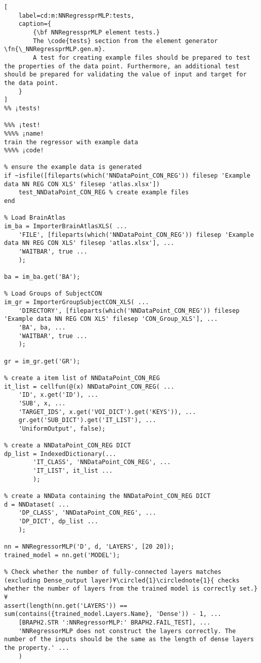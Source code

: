 \documentclass{tufte-handout}
\begin{document}
\begin{lstlisting}[
	label=cd:m:NNRegressprMLP:tests,
	caption={
		{\bf NNRegressprMLP element tests.}
		The \code{tests} section from the element generator \fn{\_NNRegressprMLP.gen.m}.
		A test for creating example files should be prepared to test the properties of the data point. Furthermore, an additional test should be prepared for validating the value of input and target for the data point.
	}
]			
%% ¡tests!

%%% ¡test!
%%%% ¡name!
train the regressor with example data
%%%% ¡code!

% ensure the example data is generated
if ~isfile([fileparts(which('NNDataPoint_CON_REG')) filesep 'Example data NN REG CON XLS' filesep 'atlas.xlsx'])
    test_NNDataPoint_CON_REG % create example files
end

% Load BrainAtlas
im_ba = ImporterBrainAtlasXLS( ...
    'FILE', [fileparts(which('NNDataPoint_CON_REG')) filesep 'Example data NN REG CON XLS' filesep 'atlas.xlsx'], ...
    'WAITBAR', true ...
    );

ba = im_ba.get('BA');

% Load Groups of SubjectCON
im_gr = ImporterGroupSubjectCON_XLS( ...
    'DIRECTORY', [fileparts(which('NNDataPoint_CON_REG')) filesep 'Example data NN REG CON XLS' filesep 'CON_Group_XLS'], ...
    'BA', ba, ...
    'WAITBAR', true ...
    );

gr = im_gr.get('GR');

% create a item list of NNDataPoint_CON_REG
it_list = cellfun(@(x) NNDataPoint_CON_REG( ...
    'ID', x.get('ID'), ...
    'SUB', x, ...
    'TARGET_IDS', x.get('VOI_DICT').get('KEYS')), ...
    gr.get('SUB_DICT').get('IT_LIST'), ...
    'UniformOutput', false);

% create a NNDataPoint_CON_REG DICT
dp_list = IndexedDictionary(...
        'IT_CLASS', 'NNDataPoint_CON_REG', ...
        'IT_LIST', it_list ...
        );

% create a NNData containing the NNDataPoint_CON_REG DICT
d = NNDataset( ...
    'DP_CLASS', 'NNDataPoint_CON_REG', ...
    'DP_DICT', dp_list ...
    );

nn = NNRegressorMLP('D', d, 'LAYERS', [20 20]);
trained_model = nn.get('MODEL');

% Check whether the number of fully-connected layers matches (excluding Dense_output layer)¥\circled{1}\circlednote{1}{ checks whether the number of layers from the trained model is correctly set.}¥
assert(length(nn.get('LAYERS')) == sum(contains({trained_model.Layers.Name}, 'Dense')) - 1, ...
    [BRAPH2.STR ':NNRegressorMLP:' BRAPH2.FAIL_TEST], ...
    'NNRegressorMLP does not construct the layers correctly. The number of the inputs should be the same as the length of dense layers the property.' ...
    )

\end{lstlisting}
\end{document}
